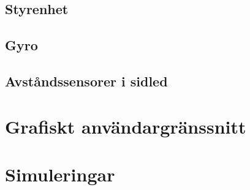 \documentclass[a4paper,titlepage,12pt]{article}
\begin{document}
    \subsection{Styrenhet}

    \subsection{Gyro}
    
    \subsection{Avståndssensorer i sidled}


	\section{Grafiskt användargränssnitt}
    

	\section{Simuleringar}
    
\end{document}
